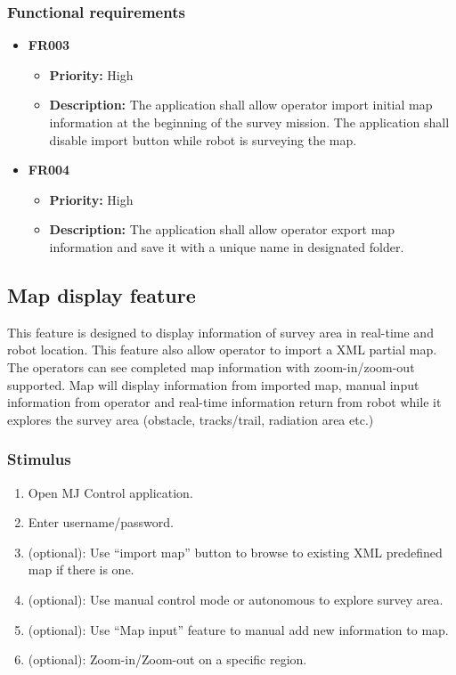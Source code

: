 \documentclass[10pt,a4paper,titlepage]{article}
\begin{document}
	\subsubsection*{Functional requirements}
	\begin{itemize}
		
		\item \textbf{FR003} 
		\begin{itemize}
			\item \textbf{Priority:} High
			\item \textbf{Description:} The application shall allow operator import initial map information at the beginning of the survey mission. The application shall disable import button while robot is surveying the map.
		\end{itemize}
	
		\item \textbf{FR004} 
		\begin{itemize}
			\item \textbf{Priority:} High
			\item \textbf{Description:} The application shall allow operator export map information and save it with a unique name in designated folder.
		\end{itemize}
	\end{itemize}
	
	\subsection{Map display feature}
	This feature is designed to display information of survey area in real-time and robot location. This feature also allow operator to import a XML partial map. The operators can see completed map information with zoom-in/zoom-out supported. Map will display information from imported map, manual input information from operator and real-time information return from robot while it explores the survey area (obstacle, tracks/trail, radiation area etc.)
	
	\subsubsection*{Stimulus}
	\begin{enumerate}
		\item Open MJ Control application.
		\item Enter username/password.
		\item (optional): Use “import map” button to browse to existing XML predefined map if there is one.
		\item (optional): Use manual control mode or autonomous to explore survey area.
		\item (optional): Use “Map input” feature to manual add new information to map.
		\item (optional): Zoom-in/Zoom-out on a specific region.  
	\end{enumerate}
	
\end{document}
